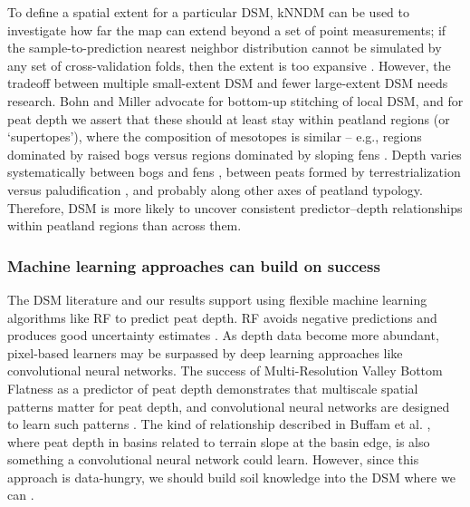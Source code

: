\documentclass[soil, manuscript]{copernicus}
\begin{document}
To define a spatial extent for a particular DSM, kNNDM can be used to investigate how far the map can extend beyond a set of point measurements; if the sample-to-prediction nearest neighbor distribution cannot be simulated by any set of cross-validation folds, then the extent is too expansive \citep{meyerMachineLearningbasedGlobal2022, linnenbrinkKNNDMCVKfold2024}.
However, the tradeoff between multiple small-extent DSM and fewer large-extent DSM needs research.
Bohn and Miller \citeyearpar{bohnLocallyEnhancedDigital2024} advocate for bottom-up stitching of local DSM, and for peat depth we assert that these should at least stay within peatland regions (or `supertopes'), where the composition of mesotopes is similar -- e.g., regions dominated by raised bogs versus regions dominated by sloping fens \citep{moenNationalAtlasNorway1999, joostenWiseUseMires2002}.
Depth varies systematically between bogs and fens \citep{lindsayPeatlandMireTypes2016}, between peats formed by terrestrialization versus paludification \citep{buffamFillingHolesRegional2010}, and probably along other axes of peatland typology.
Therefore, DSM is more likely to uncover consistent predictor--depth relationships within peatland regions than across them.

\subsubsection{Machine learning approaches can build on success}

The DSM literature and our results support using flexible machine learning algorithms like RF to predict peat depth.
RF avoids negative predictions \citep[c.f.][]{kogantiMappingPeatDepth2023} and produces good uncertainty estimates \citep[our study,][]{vaysseUsingQuantileRegression2017, takoutsingComparingPredictionPerformance2022}.
As depth data become more abundant, pixel-based learners may be surpassed by deep learning approaches like convolutional neural networks.
The success of Multi-Resolution Valley Bottom Flatness as a predictor of peat depth demonstrates that multiscale spatial patterns matter for peat depth, and convolutional neural networks are designed to learn such patterns \citep{borowiecDeepLearningTool2022}.
The kind of relationship described in Buffam et al. \citeyearpar{buffamFillingHolesRegional2010}, where peat depth in basins related to terrain slope at the basin edge, is also something a convolutional neural network could learn.
However, since this approach is data-hungry, we should build soil knowledge into the DSM where we can \citep{minasnySoilScienceInformedMachine2024}.
\end{document}
